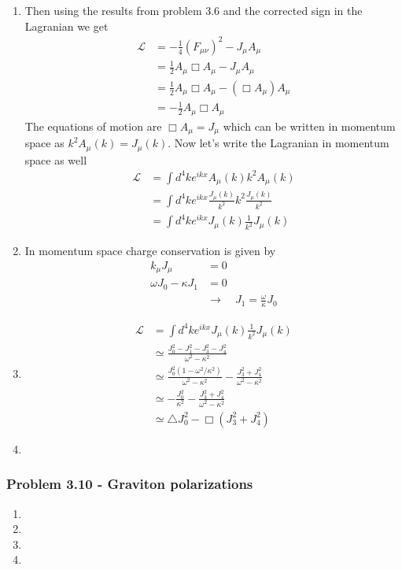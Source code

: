 \documentclass[10pt,a4paper]{article}
\theoremstyle{definition}
\begin{document}
\begin{enumerate}[label=(\alph*)]
\item Then using the results from problem 3.6 and the corrected sign in the Lagranian we get
\begin{align}
\mathcal{L}&=-\frac{1}{4}(F_{\mu\nu})^2-J_\mu A_\mu\\
&=\frac{1}{2}A_\mu\Box A_\mu-J_\mu A_\mu\\
&=\frac{1}{2}A_\mu\Box A_\mu-(\Box A_\mu) A_\mu\\
&=-\frac{1}{2}A_\mu\Box A_\mu
\end{align}
The equations of motion are $\Box A_\mu=J_\mu$ which can be written in momentum space as $k^2A_\mu(k)=J_\mu(k)$. Now let's write the Lagranian in momentum space as well
\begin{align}
\mathcal{L}&=\int d^4k e^{ikx}A_\mu(k)k^2A_\mu(k)\\
&=\int d^4k e^{ikx}\frac{J_\mu(k)}{k^2}k^2\frac{J_\mu(k)}{k^2}\\
&=\int d^4k e^{ikx}J_\mu(k)\frac{1}{k^2}J_\mu(k)
\end{align} 
\item In momentum space charge conservation is given by
\begin{align}
  k_\mu J_\mu&=0\\
  \omega J_0-\kappa J_1&=0\\
  &\rightarrow\quad J_1=\frac{\omega}{\kappa}J_0
\end{align}

\item
\begin{align}
\mathcal{L}&=\int d^4k e^{ikx}J_\mu(k)\frac{1}{k^2}J_\mu(k)\\
&\simeq\frac{J_0^2-J_1^2-J_3^2-J_4^2}{\omega^2-\kappa^2}\\
&\simeq\frac{J_0^2(1-\omega^2/\kappa^2)}{\omega^2-\kappa^2}-\frac{J_3^2+J_4^2}{\omega^2-\kappa^2}\\
&\simeq-\frac{J_0^2}{\kappa^2}-\frac{J_3^2+J_4^2}{\omega^2-\kappa^2}\\
&\simeq\triangle J_0^2-\Box(J_3^2+J_4^2)
\end{align} 

\item
\end{enumerate}


\subsubsection{Problem 3.10 - Graviton polarizations}
\begin{enumerate}[label=(\alph*)]
\item
\item
\item
\item
\end{enumerate}
\end{document}

